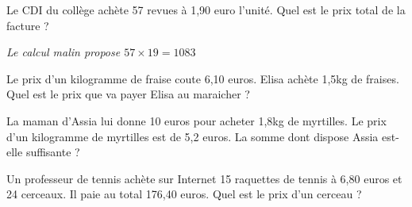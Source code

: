\begin{pageParcoursd} 



Le CDI du collège achète 57 revues à 1,90 euro l'unité. Quel est le prix total de la facture ?

\textit{Le calcul malin propose $57 \times 19 = 1083$}  





Le prix d'un kilogramme de fraise coute 6,10 euros. Elisa achète 1,5kg de fraises. Quel est le prix que va payer Elisa au maraicher ?



La maman d'Assia lui donne 10 euros pour acheter 1,8kg de myrtilles. Le prix d'un kilogramme de myrtilles est de 5,2 euros. La somme dont dispose Assia est-elle suffisante  ?



Un professeur de tennis achète sur Internet 15 raquettes de tennis à 6,80 euros et 24 cerceaux. Il paie au total 176,40 euros. Quel est le prix d'un cerceau  ?

 
 
 

\end{pageParcoursd} 